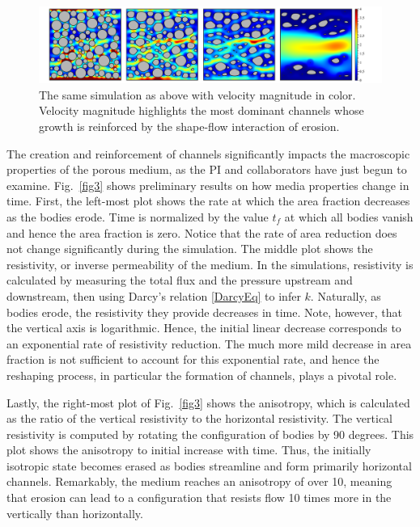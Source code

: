 \documentclass[12pt]{article}
\begin{document}
\begin{figure}%
\begin{center}
\includegraphics[width = 0.99 \textwidth]{./figs/80circ8vel.pdf}
\caption{\label{fig2} The same simulation as above with velocity magnitude in color. Velocity magnitude highlights the most dominant channels whose growth is reinforced by the shape-flow interaction of erosion.}
\end{center}
\end{figure}
 
The creation and reinforcement of channels significantly impacts the macroscopic properties of the porous medium, as the PI and collaborators have just begun to examine. Fig.~\ref{fig3} shows preliminary results on how media properties change in time. First, the left-most plot shows the rate at which the area fraction decreases as the bodies erode. Time is normalized by the value $t_f$ at which all bodies vanish and hence the area fraction is zero. Notice that the rate of area reduction does not change significantly during the simulation. The middle plot shows the resistivity, or inverse permeability of the medium. In the simulations, resistivity is calculated by measuring the total flux and the pressure upstream and downstream, then using Darcy's relation \eqref{DarcyEq} to infer $k$. Naturally, as bodies erode, the resistivity they provide decreases in time. Note, however, that the vertical axis is logarithmic. Hence, the initial linear decrease corresponds to an exponential rate of resistivity reduction. The much more mild decrease in area fraction is not sufficient to account for this exponential rate, and hence the reshaping process, in particular the formation of channels, plays a pivotal role.

Lastly, the right-most plot of Fig.~\ref{fig3} shows the anisotropy, which is calculated as the ratio of the vertical resistivity to the horizontal resistivity. The vertical resistivity is computed by rotating the configuration of bodies by 90 degrees. This plot shows the anisotropy to initial increase with time. Thus, the initially isotropic state becomes erased as bodies streamline and form primarily horizontal channels. Remarkably, the medium reaches an anisotropy of over 10, meaning that erosion can lead to a configuration that resists flow 10 times more in the vertically than horizontally.
\end{document}
